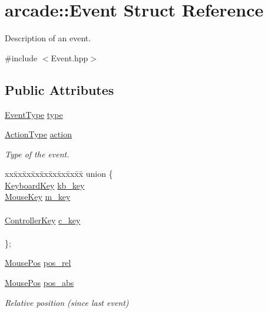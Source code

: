 \hypertarget{structarcade_1_1_event}{}\section{arcade\+:\+:Event Struct Reference}
\label{structarcade_1_1_event}


Description of an event.  




{\ttfamily \#include $<$Event.\+hpp$>$}

\subsection*{Public Attributes}
\begin{DoxyCompactItemize}
\item 
\hyperlink{namespacearcade_a608583b2070905ecc26e957409bb4f93}{Event\+Type} \hyperlink{structarcade_1_1_event_a6e626bbe20fac99017e390ea0239b9a6}{type}
\item 
\hyperlink{namespacearcade_a1b6c05b243c7e94d71fb328705e619bd}{Action\+Type} \hyperlink{structarcade_1_1_event_a4c0d22bb440a9185fe94b9a66759823c}{action}
\begin{DoxyCompactList}\small\item\em Type of the event. \end{DoxyCompactList}\item 
\begin{tabbing}
xx\=xx\=xx\=xx\=xx\=xx\=xx\=xx\=xx\=\kill
union \{\\
\>\hyperlink{namespacearcade_a347918e3b31df21087660f19962ff80e}{KeyboardKey} \hyperlink{structarcade_1_1_event_aa6cca034ec9c2c6b3d9078e8a0ce8700}{kb\_key}\\
\>\hyperlink{namespacearcade_a41017b6e882fbcad335f303c7950e4bf}{MouseKey} \hyperlink{structarcade_1_1_event_a52ed03f8b18613ade5ce903d36762f32}{m\_key}\\
\>\\
\>\hyperlink{namespacearcade_a4281850c2b4199c96efad8ba85f8aa21}{ControllerKey} \hyperlink{structarcade_1_1_event_a9d837c85701594ddda4d04dc5b1d8a39}{c\_key}\\
\>\\
\}; \\

\end{tabbing}\item 
\hyperlink{structarcade_1_1_mouse_pos}{Mouse\+Pos} \hyperlink{structarcade_1_1_event_aa2b15c031d585e6ea86952bb579ca8ef}{pos\+\_\+rel}
\item 
\hyperlink{structarcade_1_1_mouse_pos}{Mouse\+Pos} \hyperlink{structarcade_1_1_event_a6fd21ebc551b688a77061cd44b01d425}{pos\+\_\+abs}
\begin{DoxyCompactList}\small\item\em Relative position (since last event) \end{DoxyCompactList}\end{DoxyCompactItemize}



